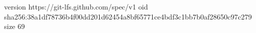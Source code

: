version https://git-lfs.github.com/spec/v1
oid sha256:38a1df78736b4f00dd201d62454a8bf65771ce4bdf3c1bb7b0af28650c97c279
size 69
